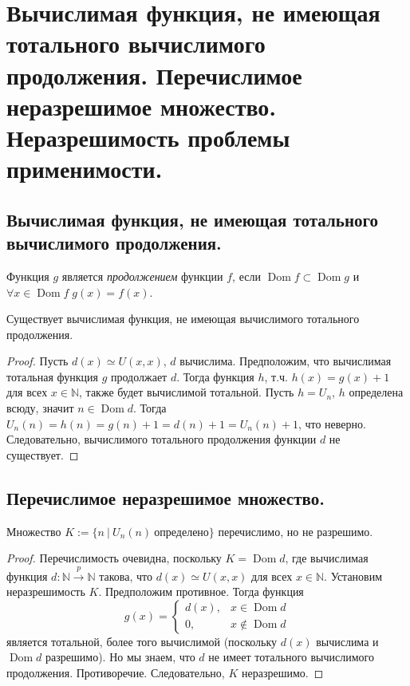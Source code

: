 \section{Вычислимая функция, не имеющая тотального вычислимого продолжения. Перечислимое неразрешимое множество. Неразрешимость проблемы применимости.}

\subsection{Вычислимая функция, не имеющая тотального вычислимого продолжения.}

\begin{definition}
  Функция $g$ является \textit{продолжением} функции $f$, если $\operatorname{Dom} f \subset
  \operatorname{Dom} g$ и $\forall x \in \operatorname{Dom} f \; g(x) = f(x)$.
\end{definition}

\begin{statement}
  Существует вычислимая функция, не имеющая вычислимого тотального продолжения.
  \begin{proof}
    Пусть $d(x) \simeq U(x, x)$, $d$ вычислима. Предположим, что вычислимая тотальная функция $g$ продолжает $d$. Тогда функция $h$, т.ч. $h(x) = g(x) + 1$ для всех $x \in \mathbb{N}$, также будет вычислимой тотальной. Пусть $h = U_n$, $h$ определена всюду, значит $n \in \operatorname{Dom} d$. Тогда $U_n(n) = h(n) = g(n) + 1 = d(n)+1 = U_n(n)+1$, что неверно. Следовательно, вычислимого тотального продолжения функции $d$ не существует.
  \end{proof}
\end{statement}

\subsection{Перечислимое неразрешимое множество.}

\begin{statement}
  Множество $K := \{n \> | \> U_n(n) \> \textit{определено} \}$ перечислимо, но не разрешимо.
  \begin{proof}
    Перечислимость очевидна, поскольку $K = \operatorname{Dom} d$, где вычислимая функция $d : \mathbb{N} \overset{p}{\to} \mathbb{N}$ такова, что $d(x) \simeq U(x,x)$ для всех $x \in \mathbb{N}$. \newline
    Установим неразрешимость $K$. Предположим противное. Тогда функция
    \[
      g(x) = \begin{cases}
        d(x), & x \in \operatorname{Dom} d \\
        0, & x \notin \operatorname{Dom} d
      \end{cases}
    \]
    является тотальной, более того вычислимой (поскольку $d(x)$ вычислима и $\operatorname{Dom} d$ разрешимо). Но мы знаем, что $d$ не имеет тотального вычислимого продолжения. Противоречие. Следовательно, $K$ неразрешимо.
  \end{proof}
\end{statement}

